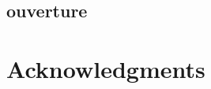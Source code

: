 \documentclass[fleqn,10pt]{SelfArx} %
\begin{document}
\subsection{ouverture}

\section*{Acknowledgments} %






\end{document}
